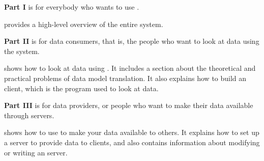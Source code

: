 \begin{description}

\item{\bf Part I} is for everybody who wants to use \opendap.

  \begin{description}
    
  \item{\bf{}} provides a high-level overview of
    the entire system.

  \end{description}
  
\item{\bf Part II} is for data consumers, that is, the people who want
  to look at data using the \opendap system.

  \begin{description}
    
  \item{\bf{}} shows how to look at data using
    \opendap.  It includes a section about the theoretical and practical
    problems of data model translation.  It also explains how to build
    an \opendap client, which is the program used to look at \opendap data.
    

  \end{description}
  
\item{\bf Part III} is for data providers, or people who want to make
  their data available through \opendap servers.

  \begin{description}
    
  \item{\bf{}} shows how to use \opendap to
    make your data available to others.  It explains how to set up a
    \opendap server to provide \opendap data to \opendap clients, and also
    contains information about modifying or writing an \opendap server.



\end{description}
\end{description}
